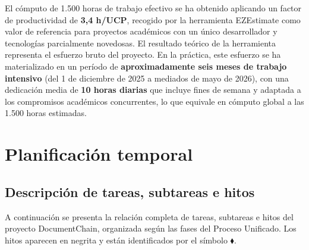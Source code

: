 \documentclass[11pt, a4paper]{article}
\begin{document}
El cómputo de 1.500 horas de trabajo efectivo se ha obtenido aplicando un factor de productividad de \textbf{3,4 h/UCP}, recogido por la herramienta EZEstimate como valor de referencia para proyectos académicos con un único desarrollador y tecnologías parcialmente novedosas. El resultado teórico de la herramienta representa el esfuerzo bruto del proyecto. En la práctica, este esfuerzo se ha materializado en un período de \textbf{aproximadamente seis meses de trabajo intensivo} (del 1 de diciembre de 2025 a mediados de mayo de 2026), con una dedicación media de \textbf{10 horas diarias} que incluye fines de semana y adaptada a los compromisos académicos concurrentes, lo que equivale en cómputo global a las 1.500 horas estimadas.

\section{Planificación temporal}

\subsection{Descripción de tareas, subtareas e hitos}

A continuación se presenta la relación completa de tareas, subtareas e hitos del proyecto DocumentChain, organizada según las fases del Proceso Unificado. Los hitos aparecen en negrita y están identificados por el símbolo $\blacklozenge$.
\end{document}
